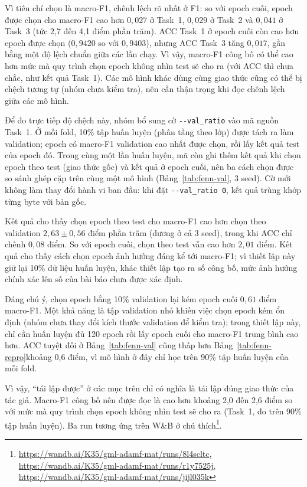 \documentclass[conference]{IEEEtran}
\renewcommand{\hl}[1]{#1}
\renewcommand{\colorbox}[2]{#2}
\begin{document}
Vì tiêu chí chọn là macro-F1, chênh lệch rõ nhất ở F1: so với epoch cuối, epoch được chọn cho
macro-F1 cao hơn $0{,}027$ ở Task~1, $0{,}029$ ở Task~2 và $0{,}041$ ở Task~3 (tức 2,7 đến 4,1 điểm
phần trăm). ACC Task~1 ở epoch cuối còn cao hơn epoch được chọn ($0{,}9420$ so với $0{,}9403$), nhưng ACC Task~3 tăng $0{,}017$, gần bằng một độ lệch chuẩn
giữa các lần chạy. \hl{Vì vậy, macro-F1 công bố có thể cao hơn mức mà quy trình chọn epoch không nhìn test
sẽ cho ra (với ACC thì chưa chắc, như kết quả Task~1). Các mô hình khác dùng cùng giao thức cũng có thể bị
chệch tương tự (nhóm chưa kiểm tra), nên cần thận trọng khi đọc chênh lệch giữa các mô hình.}

\hl{Để đo trực tiếp độ chệch này, nhóm bổ sung cờ} \colorbox{yellow}{\texttt{-{}-val\_ratio}}
\hl{vào mã nguồn Task~1. Ở mỗi fold, 10\% tập huấn luyện (phân tầng theo lớp) được tách ra làm validation;
epoch có macro-F1 validation cao nhất được chọn, rồi lấy kết quả test của epoch đó. Trong cùng một lần
huấn luyện, mã còn ghi thêm kết quả khi chọn epoch theo test (giao thức gốc) và kết quả ở epoch cuối, nên ba
cách chọn được so sánh ghép cặp trên cùng một mô hình (Bảng}\colorbox{yellow}{~\ref{tab:fenn-val}}\hl{, 3 seed).
Cờ mới không làm thay đổi hành vi ban đầu: khi đặt} \colorbox{yellow}{\texttt{-{}-val\_ratio 0}}\hl{, kết quả
trùng khớp từng byte với bản gốc.}

\hl{Kết quả cho thấy chọn epoch theo test cho macro-F1 cao hơn chọn theo validation}
\colorbox{yellow}{$2{,}63 \pm 0{,}56$}
\hl{điểm phần trăm (dương ở cả 3 seed), trong khi ACC chỉ chênh}
\colorbox{yellow}{$0{,}08$}
\hl{điểm. So với epoch cuối, chọn theo test vẫn cao hơn}
\colorbox{yellow}{$2{,}01$}
\hl{điểm. Kết quả cho thấy cách chọn epoch ảnh hưởng đáng kể tới macro-F1; vì thiết lập này giữ lại 10\% dữ liệu
huấn luyện, khác thiết lập tạo ra số công bố, mức ảnh hưởng chính xác lên số của bài báo chưa được xác định.}

\hl{Đáng chú ý, chọn epoch bằng 10\% validation lại kém epoch cuối}
\colorbox{yellow}{$0{,}61$}
\hl{điểm macro-F1. Một khả năng là tập validation nhỏ khiến việc chọn epoch kém ổn định (nhóm chưa thay đổi kích thước
validation để kiểm tra); trong thiết lập này, chỉ cần huấn luyện đủ 120 epoch rồi lấy epoch cuối cho macro-F1 trung bình cao hơn. ACC tuyệt đối ở Bảng}\colorbox{yellow}{~\ref{tab:fenn-val}}\hl{
cũng thấp hơn Bảng}\colorbox{yellow}{~\ref{tab:fenn-repro}}\hl{khoảng 0,6 điểm, vì mô hình ở đây chỉ học trên 90\%
tập huấn luyện của mỗi fold.}

\hl{Vì vậy, ``tái lập được'' ở các mục trên chỉ có nghĩa là tái lập đúng giao thức của tác giả. Macro-F1 công bố
nên được đọc là cao hơn khoảng 2,0 đến 2,6 điểm so với mức mà quy trình chọn epoch không nhìn test sẽ cho ra
(Task~1, đo trên 90\% tập huấn luyện). Ba run tương ứng trên W\&B ở chú thích}\footnote{\url{https://wandb.ai/K35/gml-adamf-mat/runs/8l4scltc}, \url{https://wandb.ai/K35/gml-adamf-mat/runs/r1y7525j}, \url{https://wandb.ai/K35/gml-adamf-mat/runs/jijl035k}}\hl{.}
\end{document}
